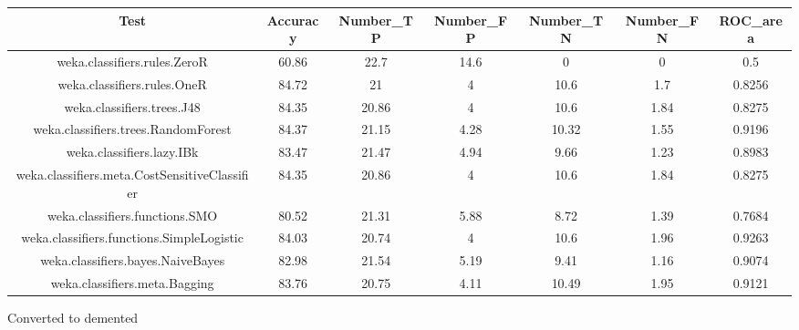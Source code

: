 \documentclass[
]{article}
\begin{document}
\begin{longtable}[]{@{}ccccccc@{}}
\toprule()
Test & Accuracy & Number\_TP & Number\_FP & Number\_TN & Number\_FN &
ROC\_area \\
\midrule()
\endhead
weka.classifiers.rules.ZeroR & 60.86 & 22.7 & 14.6 & 0 & 0 & 0.5 \\
weka.classifiers.rules.OneR & 84.72 & 21 & 4 & 10.6 & 1.7 & 0.8256 \\
weka.classifiers.trees.J48 & 84.35 & 20.86 & 4 & 10.6 & 1.84 & 0.8275 \\
weka.classifiers.trees.RandomForest & 84.37 & 21.15 & 4.28 & 10.32 &
1.55 & 0.9196 \\
weka.classifiers.lazy.IBk & 83.47 & 21.47 & 4.94 & 9.66 & 1.23 &
0.8983 \\
weka.classifiers.meta.CostSensitiveClassifier & 84.35 & 20.86 & 4 & 10.6
& 1.84 & 0.8275 \\
weka.classifiers.functions.SMO & 80.52 & 21.31 & 5.88 & 8.72 & 1.39 &
0.7684 \\
weka.classifiers.functions.SimpleLogistic & 84.03 & 20.74 & 4 & 10.6 &
1.96 & 0.9263 \\
weka.classifiers.bayes.NaiveBayes & 82.98 & 21.54 & 5.19 & 9.41 & 1.16 &
0.9074 \\
weka.classifiers.meta.Bagging & 83.76 & 20.75 & 4.11 & 10.49 & 1.95 &
0.9121 \\
\bottomrule()
\end{longtable}

Converted to demented
\end{document}
